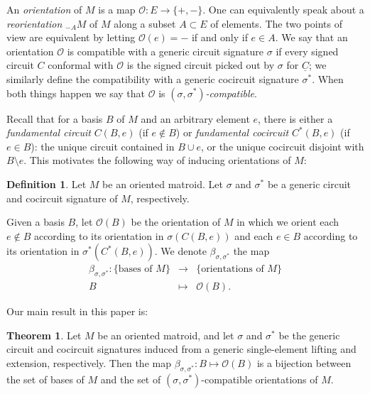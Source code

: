 \documentclass[12pt]{amsart}
\numberwithin{equation}{section}
\theoremstyle{definition}
\newcounter{mainTheorem}
\newtheorem{maintheorem}[mainTheorem]{Theorem}
\newtheorem{definition}[theorem]{Definition}
\newcommand{\Ocal}{{\mathcal O}}
\begin{document}
An {\em orientation} of $M$ is a map $\Ocal:E\rightarrow\{+,-\}$.
One can equivalently speak  about a {\em reorientation} $_{-A}M$ of $M$ along a subset $A\subset E$ of elements. The two points of view are equivalent by letting $\Ocal(e) = -$ if and only if $e\in A$.
We say that an orientation $\Ocal$ is compatible with a generic circuit signature $\sigma$ if every signed circuit $C$ conformal with $\Ocal$ is the signed circuit picked out by $\sigma$ for $\underline{C}$; we similarly define the compatibility with a generic cocircuit signature $\sigma^*$.
When both things happen we say that $\Ocal$ is {\em $(\sigma,\sigma^*)$-compatible}.

Recall that for a basis $B$ of $M$ and an arbitrary element $e$, there is either a \emph{fundamental circuit} $C(B,e)$ (if $e\not\in B$) or \emph{fundamental cocircuit} $C^*(B,e)$ (if $e\in B$): the unique circuit contained in $B\cup e$, or the unique cocircuit disjoint with $B\setminus e$. This motivates the following way of inducing orientations of $M$:

\begin{definition}
\label{defi:beta}
    Let $M$ be an oriented matroid. Let $\sigma$ and $\sigma^*$ be a generic circuit and cocircuit signature of $M$, respectively. 

     Given a basis $B$, let $\Ocal(B)$ be the orientation of $M$ in which we orient each $e \not\in B$ according to its orientation in $\sigma(C(B,e))$ and each $e \in B$ according to its orientation in $\sigma^*(C^*(B,e))$. We denote
    $\beta_{\sigma,\sigma^*}$ the map 
    \[
    \begin{array}{ccc}
    \beta_{\sigma,\sigma^*} : \{\text{bases of }M\} &\longrightarrow &\{\text{orientations of }M\}\\
    B &\longmapsto &\Ocal(B).
    \end{array}
    \]
\end{definition}

Our main result in this paper is:

\begin{maintheorem} \label{thm:main}
Let $M$ be an oriented matroid, and let $\sigma$ and $\sigma^*$ be the generic circuit and cocircuit signatures induced from a generic single-element lifting and extension, respectively.
%
Then the map 
$
\beta_{\sigma,\sigma^*}:B \mapsto \Ocal(B)
$
is a bijection between the set of bases of $M$ and the set of $(\sigma,\sigma^*)$-compatible orientations of $M$.
\end{maintheorem}
\end{document}
